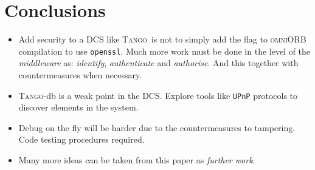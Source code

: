 \documentclass[10pt,a4paper,twoside]{llncs}
\newcommand{\tango}{\textsc{Tango}}
\newcommand{\omniorb}{\textsc{omniORB}}
\begin{document}
    
\section{Conclusions}\label{sec:conclusions}

\begin{itemize}
    \item Add security to a DCS like \tango\, is not to simply add the flag to \omniorb\, compilation to use {\tt openssl}. Much more work must be done in the level of the \emph{middleware} as: \emph{identify}, \emph{authenticate} and \emph{authorise}. And this together with countermeasures when necessary.
    \item \tango-db is a weak point in the DCS. Explore tools like {\tt UPnP} protocols to discover elements in the system.
    \item Debug on the fly will be harder due to the countermeasures to tampering. Code testing procedures required.
    \item Many more ideas can be taken from this paper as \emph{further work}.
\end{itemize}




\end{document}
